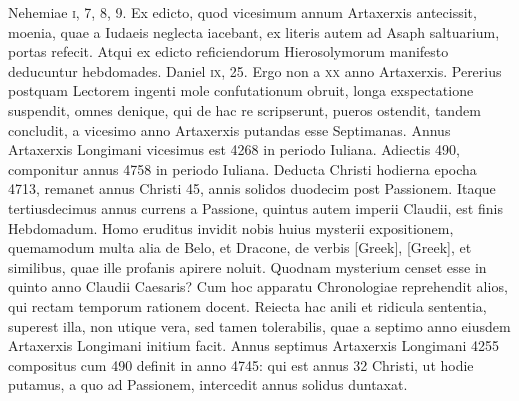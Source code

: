 Nehemiae \textsc{i}, 7, 8, 9.
Ex edicto, quod vicesimum
annum Artaxerxis antecissit, moenia, quae a Iudaeis neglecta
iacebant, ex literis autem ad Asaph saltuarium, portas refecit.
Atqui ex edicto reficiendorum Hierosolymorum manifesto deducuntur
hebdomades.
Daniel \textsc{ix}, 25.
Ergo non a \textsc{xx} anno Artaxerxis.
Pererius postquam Lectorem ingenti mole confutationum
obruit, longa exspectatione suspendit, omnes denique, qui
de hac re scripserunt, pueros ostendit, tandem concludit, a vicesimo
anno Artaxerxis putandas esse Septimanas.
Annus Artaxerxis
Longimani vicesimus est 4268 in periodo Iuliana.
Adiectis 490,
componitur annus 4758 in periodo Iuliana.
Deducta Christi hodierna
epocha 4713, remanet annus Christi 45, annis solidos duodecim
post Passionem.
Itaque tertiusdecimus annus currens a Passione,
quintus autem imperii Claudii, est finis Hebdomadum.
Homo eruditus invidit nobis huius mysterii expositionem, quemamodum
multa alia de Belo, et Dracone, de verbis \textgreek{[Greek]},
\textgreek{[Greek]}, et similibus, quae ille profanis apirere noluit.
Quodnam mysterium censet esse in quinto anno Claudii Caesaris?
Cum hoc apparatu Chronologiae reprehendit alios, qui rectam
temporum rationem docent.
Reiecta hac anili et ridicula sententia,
superest illa, non utique vera, sed tamen tolerabilis, quae a
septimo anno eiusdem Artaxerxis Longimani initium facit.
Annus septimus Artaxerxis Longimani 4255 compositus cum 490
definit in anno 4745: qui est annus 32 Christi, ut hodie putamus,
a quo ad Passionem, intercedit annus solidus duntaxat.
